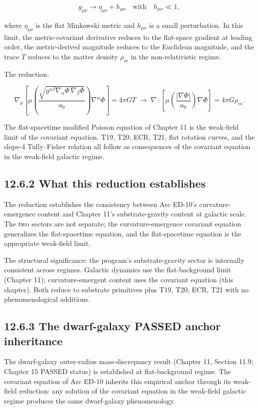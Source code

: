 \documentclass[11pt]{book}
\begin{document}
\[
g_{\mu\nu} \to \eta_{\mu\nu} + h_{\mu\nu}\quad\text{with}\quad h_{\mu\nu} \ll 1,
\]

where $\eta_{\mu\nu}$ is the flat Minkowski metric and $h_{\mu\nu}$ is a small perturbation. In this limit, the metric-covariant derivative reduces to the flat-space gradient at leading order, the metric-derived magnitude reduces to the Euclidean magnitude, and the trace $T$ reduces to the matter density $\rho_m$ in the non-relativistic regime.

The reduction:

\[
\nabla_\mu\!\left[\mu\!\left(\frac{\sqrt{g^{\alpha\beta}\nabla_\alpha\Phi\,\nabla_\beta\Phi}}{a_0}\right)\nabla^\mu\Phi\right] = 4\pi G T \;\longrightarrow\; \nabla\cdot\!\left[\mu\!\left(\frac{|\nabla\Phi|}{a_0}\right)\nabla\Phi\right] = 4\pi G\rho_m.
\]

The flat-spacetime modified Poisson equation of Chapter 11 is the weak-field limit of the covariant equation. T19, T20, ECR, T21, flat rotation curves, and the slope-4 Tully–Fisher relation all follow as consequences of the covariant equation in the weak-field galactic regime.

\subsection{12.6.2 What this reduction establishes}

The reduction establishes the consistency between Arc ED-10's curvature-emergence content and Chapter 11's substrate-gravity content at galactic scale. The two sectors are not separate; the curvature-emergence covariant equation generalizes the flat-spacetime equation, and the flat-spacetime equation is the appropriate weak-field limit.

The structural significance: the program's substrate-gravity sector is internally consistent across regimes. Galactic dynamics use the flat-background limit (Chapter 11); curvature-emergent content uses the covariant equation (this chapter). Both reduce to substrate primitives plus T19, T20, ECR, T21 with no phenomenological additions.

\subsection{12.6.3 The dwarf-galaxy PASSED anchor inheritance}

The dwarf-galaxy outer-radius mass-discrepancy result (Chapter 11, Section 11.9; Chapter 15 PASSED status) is established at flat-background regime. The covariant equation of Arc ED-10 inherits this empirical anchor through its weak-field reduction: any solution of the covariant equation in the weak-field galactic regime produces the same dwarf-galaxy phenomenology.
\end{document}
